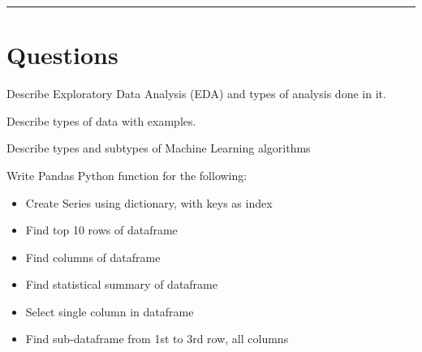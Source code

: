 \documentclass[11pt,paper=a4]{exam}
\begin{document}
\rule{\textwidth}{1pt}
\section*{Questions}

\begin{questions}
\question[4] Describe Exploratory Data Analysis (EDA) and types of analysis done in it.

  
\question[6] Describe types of data with examples.

		
\question[4] Describe types and subtypes of Machine Learning algorithms 

			
			
\question[6] Write Pandas Python function for the following:

				\begin{itemize}
				\item Create Series using dictionary, with keys as index 
				\item Find top 10 rows of dataframe
				\item Find columns of dataframe
				\item Find statistical summary of dataframe
				\item Select single column in dataframe
				\item Find sub-dataframe from 1st to 3rd row, all columns
				\end{itemize}

 
\end{questions}
\end{document}
